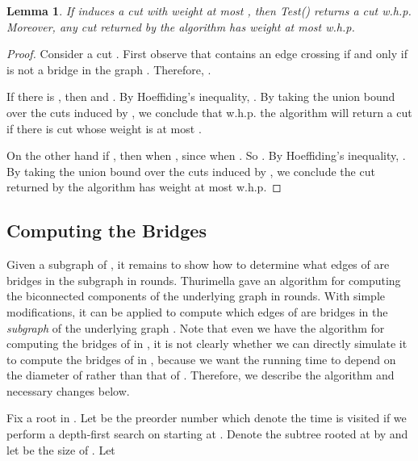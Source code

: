 \documentclass[11pt]{article}
\newtheorem{lemma}[theorem]{Lemma}
\begin{document}
\begin{lemma} If  induces a cut  with weight at most , then Test() returns a cut w.h.p. Moreover, any cut returned by the algorithm has weight at most  w.h.p. \end{lemma}

\begin{proof}

Consider a cut . First observe that  contains an edge crossing  if and only if  is not a bridge in the graph . Therefore, . 

If there is , then  and . By Hoeffiding's inequality, . By taking the union bound over the  cuts induced by , we conclude that w.h.p. the algorithm will return a cut if there is cut whose weight is at most .

On the other hand if , then  when , since  when . So . By Hoeffiding's inequality, . By taking the union bound over the  cuts induced by , we conclude the cut returned by the algorithm has weight at most  w.h.p.
\end{proof}

\subsection{Computing the Bridges}
Given a subgraph  of , it remains to show how to determine what edges of  are bridges in the subgraph  in  rounds. Thurimella \cite{Thurimella97} gave an algorithm for computing the biconnected components of the underlying graph in  rounds. With simple modifications, it can be applied to compute which edges of  are bridges in the {\it subgraph}  of the underlying graph . Note that even we have the algorithm for computing the bridges of  in , it is not clearly whether we can directly simulate it to compute the bridges of  in , because we want the running time to depend on the diameter of  rather than that of . Therefore, we describe the algorithm and necessary changes below.

\renewcommand\thefootnote{\fnsymbol{footnote}}
Fix a root  in . Let  be the preorder number which denote the time  is visited if we perform a depth-first search on  starting at . Denote the subtree rooted at  by  and let  be the size of . Let
\addtocounter{footnote}{1} 
\end{document}

